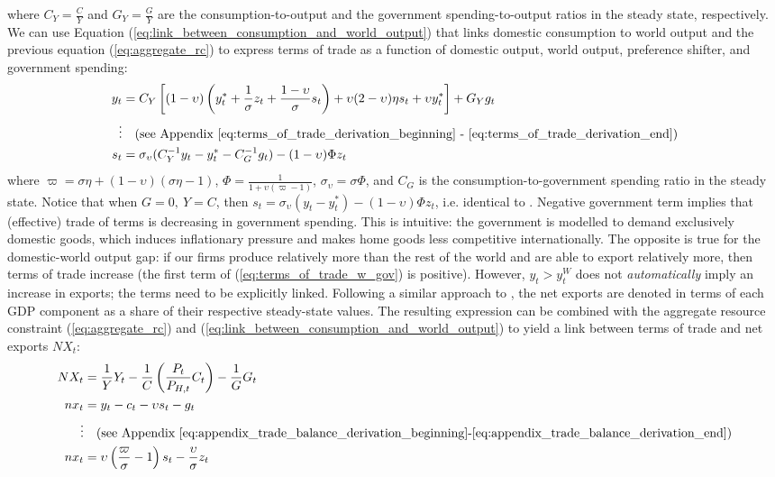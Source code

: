 where $C_Y=\frac{C}{Y}$ and $G_Y = \frac{G}{Y}$ are the consumption-to-output and the government spending-to-output ratios in the steady state, respectively. We can use Equation (\ref{eq:link_between_consumption_and_world_output}) that links domestic consumption to world output and the previous equation (\ref{eq:aggregate_rc}) to express terms of trade as a function of domestic output, world output, preference shifter, and government spending:
\begin{align}
 y_t &= C_Y\left[(1-\upsilon)\left( y^*_t + \frac{1}{\sigma}z_t + \frac{1-\upsilon}{\sigma}s_t \right) + \upsilon (2-\upsilon)\eta s_t + \upsilon y^*_t\right] + G_Y g_t \\
 \vdots & \quad \text{(see Appendix \ref{eq:terms_of_trade_derivation_beginning} - \ref{eq:terms_of_trade_derivation_end})} \nonumber \\
 s_t &= \sigma_\upsilon(C_Y^{-1} y_t - y^*_t - C_G^{-1} g_t) - (1-\upsilon)\Phi z_t \label{eq:terms_of_trade_w_gov}
\end{align}
where $\varpi = \sigma \eta + (1-\upsilon)(\sigma \eta - 1)$, $\Phi = \frac{1}{1 + \upsilon (\varpi - 1)}$, $\sigma_\upsilon = \sigma \Phi$, and $C_G$ is the consumption-to-government spending ratio in the steady state. Notice that when $G=0,\ Y=C$, then $s_t = \sigma_\upsilon(y_t - y^*_t) - (1-\upsilon)\Phi z_t$, i.e. identical to \textcite[238]{jordigal_2015_monetary}. Negative government term implies that (effective) trade of terms is decreasing in government spending. This is intuitive: the government is modelled to demand exclusively domestic goods, which induces inflationary pressure and makes home goods less competitive internationally. The opposite is true for the domestic-world output gap: if our firms produce relatively more than the rest of the world and are able to export relatively more, then terms of trade increase (the first term of (\ref{eq:terms_of_trade_w_gov}) is positive). However, $y_t > y^W_t$ does not \textit{automatically} imply an increase in exports; the terms need to be explicitly linked. Following a similar approach to \citereset\textcite{jordigal_2015_monetary}, the net exports are denoted in terms of each GDP component as a share of their respective steady-state values. The resulting expression can be combined with the aggregate resource constraint (\ref{eq:aggregate_rc}) and (\ref{eq:link_between_consumption_and_world_output}) to yield a link between terms of trade and net exports $NX_t$:
\begin{align}
 NX_t &= \frac{1}{Y} Y_t - \frac{1}{C}\left(\frac{P_t}{P_{H,t}}C_t\right) - \frac{1}{G}G_t \\
 nx_t &= y_t - c_t - \upsilon s_t - g_t \label{eq:trade_balance_w_consumption} \\
 \vdots & \quad \text{(see Appendix \ref{eq:appendix_trade_balance_derivation_beginning}-\ref{eq:appendix_trade_balance_derivation_end})} \nonumber \\
 nx_t&=\upsilon \left(\frac{\varpi}{\sigma} - 1\right) s_t - \frac{\upsilon}{\sigma}z_t \label{eq:trade_balance_wout_consumption}
\end{align}
